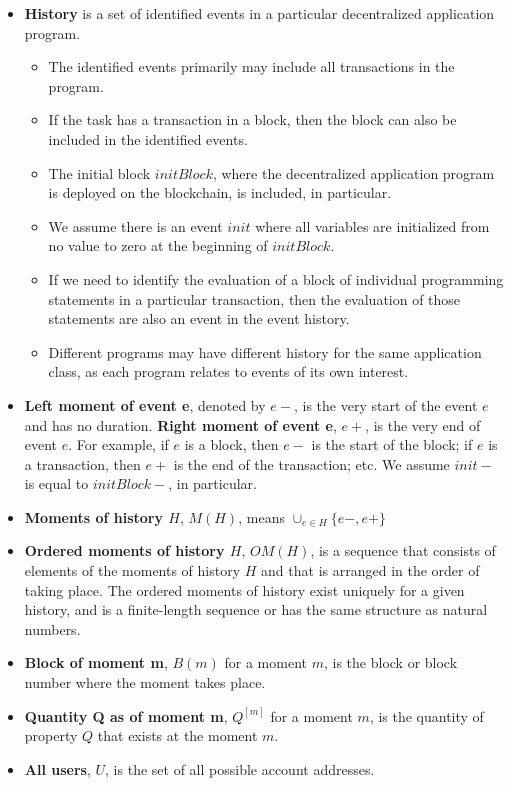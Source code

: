 \documentclass{article}
\begin{document}
\begin{itemize}
  \item {\textbf{History}} is a set of identified events in a particular 
  decentralized application program.
  \begin{itemize}
    \item The identified events primarily may include all transactions in the program.
    \item If the task has a transaction in a block, then the block can also be included in the 
    identified events.
    \item The initial block \textbf{$initBlock$}, where the decentralized 
    application program is deployed on the blockchain, is included, in particular.
    \item We assume there is an event \textbf{$init$} where all variables are initialized 
    from no value to zero at the beginning of $initBlock$.
    \item If we need to identify the evaluation of a block of individual programming 
    statements in a particular transaction, 
    then the evaluation of those statements are also an event in the event history.
    \item Different programs may have different history for the same application class, 
    as each program relates to events of its own interest.
  \end{itemize} 
  \item {\textbf{Left moment of event e}, denoted by $e-$}, is the very start of the event $e$
  and has no duration. \textbf{Right moment of event e}, $e+$, is the very end of event $e$.
  For example, if $e$ is a block, then $e-$ is the start of the block;
  if $e$ is a transaction, then $e+$ is the end of the transaction; etc. 
  We assume $init-$ is equal to $initBlock-$, in particular.
  \item {\textbf{Moments of history $H$}, $M(H)$}, means $ \cup_{e \in H} \{ e-, e+\} $
  \item {\textbf{Ordered moments of history $H$}, $OM(H)$}, is a sequence 
  that consists of elements of the moments of history $H$ and that is arranged 
  in the order of taking place. The ordered moments of history exist uniquely 
  for a given history, and is 
  a finite-length sequence or has the same structure as natural numbers.
  \item {\textbf{Block of moment m}, $B(m)$} for a moment $m$, 
  is the block or block number where the moment takes place.
  \item {\textbf{Quantity Q as of moment m}}, $Q^{[m]}$ for a moment $m$, is the quantity of 
  property $Q$ that exists at the moment $m$.
  \item {\textbf{All users}, $U$}, is the set of all possible account addresses.
\end{itemize}
\end{document}
